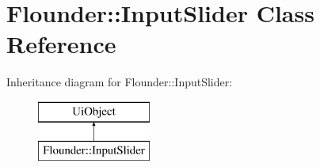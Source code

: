 \hypertarget{class_flounder_1_1_input_slider}{}\section{Flounder\+:\+:Input\+Slider Class Reference}
\label{class_flounder_1_1_input_slider}
Inheritance diagram for Flounder\+:\+:Input\+Slider\+:\begin{figure}[H]
\begin{center}
\leavevmode
\includegraphics[height=2.000000cm]{class_flounder_1_1_input_slider}
\end{center}
\end{figure}

